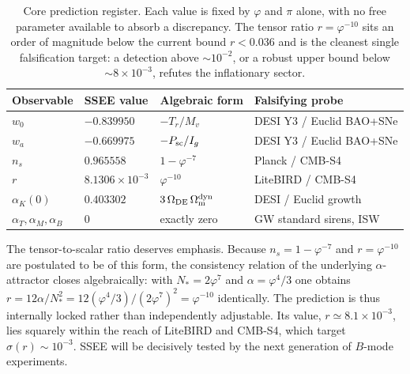 \documentclass[aps,prd,preprint,amsmath,amssymb,nofootinbib,longbibliography]{revtex4-2}
\newcommand{\Om}{\Omega_{\mathrm{m}}}
\begin{document}
\begin{table}[h]
\centering
\begin{tabular}{@{}llll@{}}
\toprule
Observable & SSEE value & Algebraic form & Falsifying probe \\
\midrule
$w_0$            & $-0.839950$              & $-T_r/M_v$            & DESI Y3 / Euclid BAO+SNe \\
$w_a$            & $-0.669975$              & $-P_{\rm sc}/I_g$ & DESI Y3 / Euclid BAO+SNe \\
$n_s$            & $0.965558$               & $1-\varphi^{-7}$      & Planck / CMB-S4 \\
$r$              & $8.1306\times10^{-3}$     & $\varphi^{-10}$       & LiteBIRD / CMB-S4 \\
$\alpha_K(0)$    & $0.403302$               & $3\,\Omega_{\rm DE}\,\Om^{\mathrm{dyn}}$ & DESI / Euclid growth \\
$\alpha_T,\alpha_M,\alpha_B$ & $0$        & exactly zero          & GW standard sirens, ISW \\
\bottomrule
\end{tabular}
\caption{Core prediction register. Each value is fixed by $\varphi$ and $\pi$
alone, with no free parameter available to absorb a discrepancy. The tensor
ratio $r=\varphi^{-10}$ sits an order of magnitude below the current bound
$r<0.036$ and is the cleanest single falsification target: a detection above
$\sim10^{-2}$, or a robust upper bound below $\sim8\times10^{-3}$, refutes the
inflationary sector.}
\label{tab:predictions-core}
\end{table}

The tensor-to-scalar ratio deserves emphasis. Because $n_s=1-\varphi^{-7}$ and
$r=\varphi^{-10}$ are postulated to be of this form, the consistency relation of
the underlying $\alpha$-attractor closes algebraically: with $N_*=2\varphi^7$
and $\alpha=\varphi^4/3$ one obtains
$r=12\alpha/N_*^2=12(\varphi^4/3)/(2\varphi^7)^2=\varphi^{-10}$ identically. The
prediction is thus internally locked rather than independently adjustable. Its
value, $r\simeq8.1\times10^{-3}$, lies squarely within the reach of LiteBIRD and
CMB-S4, which target $\sigma(r)\sim10^{-3}$. SSEE will be decisively tested by
the next generation of $B$-mode experiments.
\end{document}
